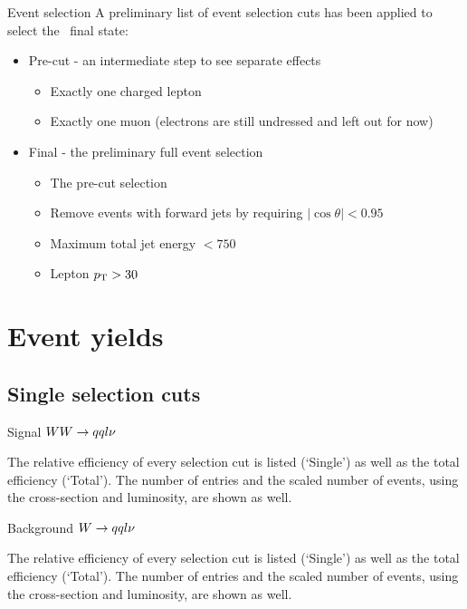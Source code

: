 \documentclass{beamer}
\newcommand{\texpath}{../analysis/tex/tex_ex}
\begin{document}
\begin{frame}{Event selection}
A preliminary list of event selection cuts has been applied to select the \qqln\ final state:
\begin{itemize}
%
\item Pre-cut - an intermediate step to see separate effects
\begin{itemize}
\item Exactly one charged lepton
\item Exactly one muon (electrons are still undressed and left out for now)
\end{itemize}
%
\item Final - the preliminary full event selection
\begin{itemize}
\item The pre-cut selection
\item Remove events with forward jets by requiring $|\cos \theta| < 0.95$
\item Maximum total jet energy $< 750$~\GeV
\item Lepton $p_\mathrm{T} > 30$~\GeV
\end{itemize}
%
\end{itemize}
\end{frame}









\section{Event yields}

\subsection{Single selection cuts}

\begin{frame}{Signal $WW\rightarrow qql\nu$}

The relative efficiency of every selection cut is listed (`Single') as well as the total efficiency (`Total').
%
The number of entries and the scaled number of events, using the cross-section and luminosity, are shown as well.
\end{frame}

\begin{frame}{Background $W\rightarrow qql\nu$}

The relative efficiency of every selection cut is listed (`Single') as well as the total efficiency (`Total').
%
The number of entries and the scaled number of events, using the cross-section and luminosity, are shown as well.
\end{frame}
\end{document}
